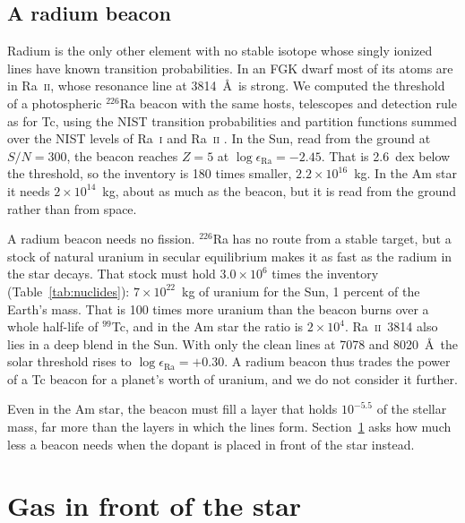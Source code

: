 \documentclass[final,5p]{elsarticle}
\begin{document}
\subsection{A radium beacon}
\label{sec:radium}

Radium is the only other element with no stable isotope whose singly ionized lines have known transition probabilities. In an FGK dwarf most of its atoms are in Ra~\textsc{ii}, whose resonance line at 3814~\AA\ is strong. We computed the threshold of a photospheric $^{226}$Ra beacon with the same hosts, telescopes and detection rule as for Tc, using the NIST transition probabilities and partition functions summed over the NIST levels of Ra~\textsc{i} and Ra~\textsc{ii} \citep{NIST2024}. In the Sun, read from the ground at $S/N = 300$, the beacon reaches $Z = 5$ at $\log\epsilon_\mathrm{Ra} = -2.45$. That is 2.6~dex below the  threshold, so the inventory is 180 times smaller, $2.2\times10^{16}$~kg. In the Am star it needs $2\times10^{14}$~kg, about as much as the  beacon, but it is read from the ground rather than from space.

A radium beacon needs no fission. $^{226}$Ra has no route from a stable target, but a stock of natural uranium in secular equilibrium makes it as fast as the radium in the star decays. That stock must hold $3.0\times10^{6}$ times the inventory (Table~\ref{tab:nuclides}): $7\times10^{22}$~kg of uranium for the Sun, 1 percent of the Earth's mass. That is 100 times more uranium than the  beacon burns over a whole half-life of $^{99}$Tc, and in the Am star the ratio is $2\times10^{4}$. Ra~\textsc{ii}~3814 also lies in a deep blend in the Sun. With only the clean lines at 7078 and 8020~\AA\ the solar threshold rises to $\log\epsilon_\mathrm{Ra} = +0.30$. A radium beacon thus trades the power of a Tc beacon for a planet's worth of uranium, and we do not consider it further.

Even in the Am star, the beacon must fill a layer that holds $10^{-5.5}$ of the stellar mass, far more than the layers in which the lines form. Section~\ref{sec:gas} asks how much less a beacon needs when the dopant is placed in front of the star instead.

\section{Gas in front of the star}
\label{sec:gas}
\end{document}
